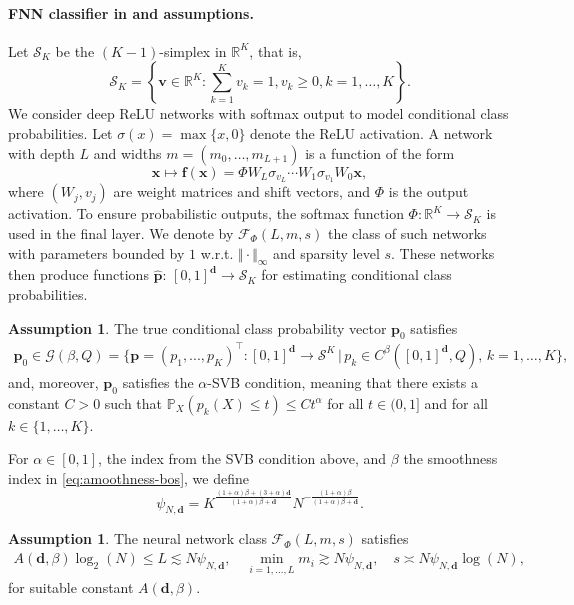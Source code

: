 \documentclass{article}
\theoremstyle{plain}
\theoremstyle{definition}
\newtheorem{assumption}[theorem]{Assumption}
\theoremstyle{remark}
\newcommand{\PP}{\mathbb{P}}
\newcommand{\RR}{\mathbb{R}}
\newcommand{\calG}{\mathcal{G}}
\begin{document}
\paragraph{FNN classifier in \citet{bos2022} and assumptions.} Let $\mathcal{S}_K$ be the $(K-1)$-simplex in $\RR^K$, that
is, \[\mathcal{S}_K=\left\{\mathbf{v}\in\mathbb{R}^K :\sum_{k=1}^K v_k=1, v_k\geq 0, k=1, \dots, K\right\}.\]
We consider deep ReLU networks with softmax output to model conditional class probabilities. 
Let $\sigma(x)=\max\{x,0\}$ denote the ReLU activation. A network with depth $L$ and widths 
$m=(m_0,\ldots,m_{L+1})$ is a function of the form
\[
\mathbf{x}\mapsto \mathbf{f(x)}=\Phi W_L \sigma_{v_L} \cdots W_1 \sigma_{v_1} W_0 \mathbf{x},
\]
where $(W_j,v_j)$ are weight matrices and shift vectors, and $\Phi$ is the output activation. 
To ensure probabilistic outputs, the softmax function $\Phi:\mathbb{R}^K \to \mathcal{S}_K$ 
is used in the final layer. We denote by $\mathcal{F}_\Phi(L,m,s)$ the class of such networks with parameters bounded by $1$ w.r.t. $\Vert \cdot \Vert_{\infty}$ and sparsity level $s$.  These networks then produce functions $\widehat{\mathbf{p}}:\,[0,1]^\mathbf{d} \to \mathcal{S}_K$  for estimating 
conditional class probabilities.


\begin{assumption}\label{ass:assumption-bos-true-proba}
The true conditional class probability vector $\mathbf{p}_0$ satisfies
    \begin{align}\label{eq:amoothness-bos}
        \mathbf{p}_0\!\in\!\calG(\beta, Q)\!=\!\Big\{\mathbf{p}=(p_1, ..., p_K)^{\top} \!: [0,1]^\mathbf{d}\rightarrow\mathcal{S}^{K} \,\Big| \, p_k\in C^{\beta}([0,1]^\mathbf{d},Q), \,k=1,\dots, K
    \Big\},
    \end{align}
   and, moreover, $\mathbf{p}_0$ satisfies the $\alpha$-SVB condition, meaning that there exists a constant $C>0$ such that
$\PP_X({p}_k(X)\leq t)\leq Ct^{\alpha}$ for all $t\in(0,1]$ and for all $k\in\{1, \dots, K\}$. 
\end{assumption}
For $\alpha\in[0,1]$, the index from the SVB condition above, and $\beta$ the smoothness index in \eqref{eq:amoothness-bos}, we define
\begin{equation}\label{eq:def-psi-bos}
  \psi_{N,\mathbf{d}}=K^{\frac{(1+\alpha)\beta+(3+\alpha)\mathbf{d}}{(1+\alpha)\beta+\mathbf{d}}} N^{-\frac{(1+\alpha)\beta}{(1+\alpha)\beta+\mathbf{d}}}.   
\end{equation}
\begin{assumption}\label{ass:assumption-bos-nn}
The neural network class $\mathcal{F}_\Phi(L,m,s)$ satisfies
    \begin{align}
        A(\mathbf{d},\beta)\log_2(N)\leq L\lesssim N \psi_{N,\mathbf{d}}, \quad \min_{i=1, ..., L} m_i \gtrsim N\psi_{N,\mathbf{d}}, \quad s\asymp N \psi_{N,\mathbf{d}} \log(N),
    \end{align}  
    for suitable constant $A(\mathbf{d}, \beta)$. 
\end{assumption}
\end{document}
